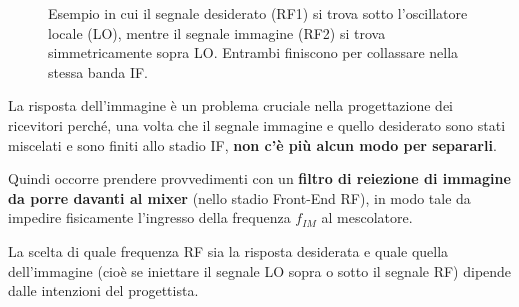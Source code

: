 \documentclass[openany,a4paper,12pt]{book}
\begin{document}
\begin{figure}[H]
    \centering
    \caption*{Esempio in cui il segnale desiderato (RF1) si trova sotto l'oscillatore locale (LO), mentre il segnale immagine (RF2) si trova simmetricamente sopra LO. Entrambi finiscono per collassare nella stessa banda IF.}
\end{figure}

La risposta dell'immagine è un problema cruciale nella progettazione dei ricevitori perché, una volta che il segnale immagine e quello desiderato sono stati miscelati e sono finiti allo stadio IF, \textbf{non c'è più alcun modo per separarli}.

Quindi occorre prendere provvedimenti con un \textbf{filtro di reiezione di immagine da porre davanti al mixer} (nello stadio Front-End RF), in modo tale da impedire fisicamente l'ingresso della frequenza $f_{IM}$ al mescolatore.

La scelta di quale frequenza RF sia la risposta desiderata e quale quella dell'immagine (cioè se iniettare il segnale LO sopra o sotto il segnale RF) dipende dalle intenzioni del progettista.

\vspace{0.5cm}
\end{document}
